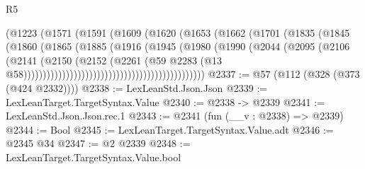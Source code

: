 \begin{lexlean}{R5}
\begin{coremodule}
                                              (@1223
                                                (@1571
                                                  (@1591
                                                    (@1609
                                                      (@1620
                                                        (@1653
                                                          (@1662
                                                            (@1701
                                                              (@1835
                                                                (@1845
                                                                  (@1860
                                                                    (@1865
                                                                      (@1885
                                                                        (@1916
                                                                          (@1945
                                                                            (@1980
                                                                              (@1990
                                                                                (@2044
                                                                                  (@2095
                                                                                    (@2106
                                                                                      (@2141
                                                                                        (@2150
                                                                                          (@2152
                                                                                            (@2261
                                                                                              (@59
                                                                                                @2283
                                                                                                (@13
                                                                                                  @58)))))))))))))))))))))))))))))))))))))))))))))))
@2337 := @57 (@112 (@328 (@373 (@424 @2332))))
@2338 := LexLeanStd.Json.Json
@2339 := LexLeanTarget.TargetSyntax.Value
@2340 := @2338 -> @2339
@2341 := LexLeanStd.Json.Json.rec.{1}
@2343 := @2341 (fun (__v : @2338) => @2339)
@2344 := Bool
@2345 := LexLeanTarget.TargetSyntax.Value.adt
@2346 := @2345 @34
@2347 := @2 @2339
@2348 := LexLeanTarget.TargetSyntax.Value.bool

\end{coremodule}
\end{lexlean}
